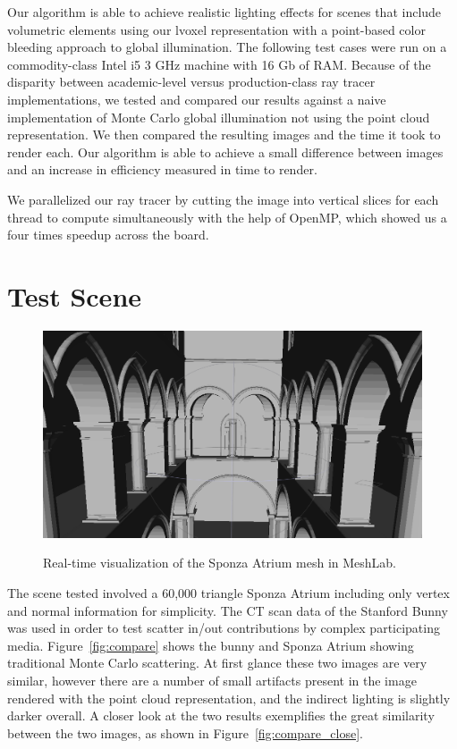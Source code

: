\documentclass[12pt]{ucthesis}
\newcommand{\captionfonts}{\small\bf\ssp}
\begin{document}
Our algorithm is able to achieve realistic lighting effects for scenes that include volumetric elements using our lvoxel representation with a point-based color bleeding approach to global illumination.
The following test cases were run on a commodity-class Intel i5 3 GHz machine with 16 Gb of RAM.  Because of the disparity between academic-level versus production-class ray tracer implementations, we tested and compared our results against a naive implementation of Monte Carlo global illumination not using the point cloud representation.  We then compared the resulting images and the time it took to render each.  Our algorithm is able to achieve a small difference between images and an increase in efficiency measured in time to render.

We parallelized our ray tracer by cutting the image into vertical slices for each thread to compute simultaneously with the help of OpenMP, which showed us a four times speedup across the board.

\section{Test Scene}

\begin{figure}[h!]
    \centering
    \includegraphics[width=120mm]{img/sponza_vis.png}
    \captionfonts
    \caption{Real-time visualization of the Sponza Atrium mesh in MeshLab.}
    \label{fig:sponza_meshlab}
\end{figure}

The scene tested involved a 60,000 triangle Sponza Atrium including only vertex and normal information for simplicity.  The CT scan data of the Stanford Bunny was used in order to test scatter in/out contributions by complex participating media.
Figure~\ref{fig:compare} shows the bunny and Sponza Atrium showing traditional Monte Carlo scattering.  At first glance these two images are very similar, however there are a number of small artifacts present in the image rendered with the point cloud representation, and the indirect lighting is slightly darker overall.  A closer look at the two results exemplifies the great similarity between the two images, as shown in Figure~\ref{fig:compare_close}.
\end{document}
